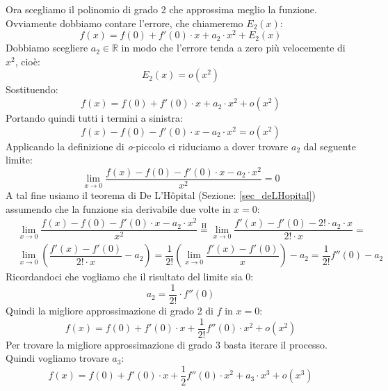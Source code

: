 Ora scegliamo il polinomio di grado 2 che approssima meglio la funzione. 
Ovviamente dobbiamo contare l'errore, che chiameremo $E_2(x)$:
\begin{equation*}
	f(x) = f(0) + f'(0) \cdot x + a_2 \cdot x^2 + E_2(x)
\end{equation*}
Dobbiamo scegliere $a_2 \in \mathbb{R}$ in modo che l'errore tenda a zero più 
velocemente di $x^2$, cioè:
\begin{equation*}
	E_2(x) = o(x^2)
\end{equation*}
Sostituendo:
\begin{equation*}
	f(x) = f(0) + f'(0) \cdot x + a_2 \cdot x^2 + o(x^2)
\end{equation*}
Portando quindi tutti i termini a sinistra:
\begin{equation*}
	f(x) - f(0) - f'(0) \cdot x - a_2 \cdot x^2 = o(x^2)
\end{equation*}
Applicando la definizione di \textit{o}-piccolo ci riduciamo a dover trovare 
$a_2$ dal seguente limite:
\begin{equation*}
	\lim_{x \to 0} \dfrac{f(x) - f(0) - f'(0) \cdot x - a_2 \cdot x^2}{x^2} = 0
\end{equation*}
A tal fine usiamo il teorema di De L'Hôpital (Sezione: \ref{sec_deLHopital}) 
assumendo che la funzione sia derivabile due volte in $x = 0$:
\begin{align*}
	&\lim_{x \to 0} \dfrac{f(x) - f(0) - f'(0) \cdot x - a_2 \cdot x^2}{x^2} 
    \stackrel{\text{H}}{=} \lim_{x \to 0} \dfrac{f'(x) - f'(0) - 2! \cdot a_2 
    \cdot x}{2! \cdot x} =\\[10pt]
	&\lim_{x \to 0} \left(\dfrac{f'(x) - f'(0)}{2! \cdot x} - a_2\right) = 
    \dfrac{1}{2!} \left(\lim_{x \to 0} \dfrac{f'(x) - f'(0)}{x} \right) - a_2 =  
    \dfrac{1}{2!} f''(0) - a_2
\end{align*}
Ricordandoci che vogliamo che il risultato del limite sia 0:
\begin{equation*}
	a_2 = \dfrac{1}{2!} \cdot f''(0)
\end{equation*}
Quindi la migliore approssimazione di grado 2 di $f$ in $x = 0$:
\begin{equation*}
	f(x) = f(0) + f'(0) \cdot x + \dfrac{1}{2!} f''(0) \cdot x^2 + o(x^2)
\end{equation*}
Per trovare la migliore approssimazione di grado 3 basta iterare il processo. 
Quindi vogliamo trovare $a_3$:
\begin{equation*}
	f(x) = f(0) + f'(0) \cdot x + \dfrac{1}{2} f''(0) \cdot x^2 + a_3 \cdot 
    x^3 + o(x^3)
\end{equation*}
